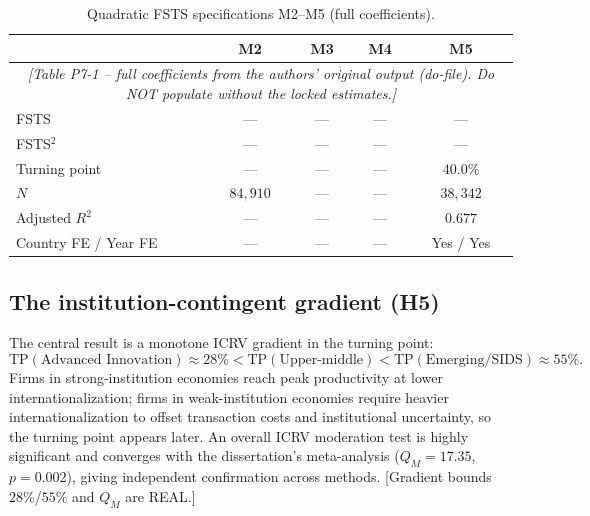 \documentclass[12pt,a4paper]{article}
\begin{document}
\begin{table}[H]
\centering
\caption{Quadratic FSTS specifications M2--M5 (full coefficients).}
\begin{tabularx}{\textwidth}{Xcccc}
\toprule
 & M2 & M3 & M4 & M5 \\
\midrule
\multicolumn{5}{c}{\itshape [Table P7-1 -- full coefficients from the authors'
original output (do-file). Do NOT populate without the locked estimates.]}\\
FSTS              & --- & --- & --- & --- \\
FSTS$^2$          & --- & --- & --- & --- \\
Turning point     & --- & --- & --- & $40.0\%$ \\
$N$               & $84{,}910$ & --- & --- & $38{,}342$ \\
Adjusted $R^2$    & --- & --- & --- & $0.677$ \\
Country FE / Year FE & --- & --- & --- & Yes / Yes \\
\bottomrule
\end{tabularx}
\end{table}

\subsection{The institution-contingent gradient (H5)}
The central result is a monotone ICRV gradient in the turning point:
\[
\mathrm{TP}(\text{Advanced Innovation}) \approx 28\%
  < \mathrm{TP}(\text{Upper-middle})
  < \mathrm{TP}(\text{Emerging/SIDS}) \approx 55\%.
\]
Firms in strong-institution economies reach peak productivity at lower
internationalization; firms in weak-institution economies require heavier
internationalization to offset transaction costs and institutional
uncertainty, so the turning point appears later. An overall ICRV moderation
test is highly significant and converges with the dissertation's
meta-analysis ($Q_M = 17.35$, $p = 0.002$), giving independent confirmation
across methods. [Gradient bounds $28\%$/$55\%$ and $Q_M$ are REAL.]
\end{document}
